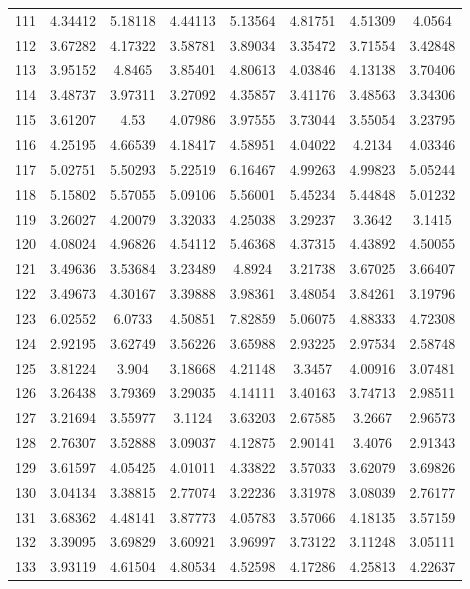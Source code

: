 \begin{center}
\begin{longtable}{cccccccc}
111 & 4.34412 & 5.18118 & 4.44113 & 5.13564 & 4.81751 & 4.51309 & 4.0564\\
112 & 3.67282 & 4.17322 & 3.58781 & 3.89034 & 3.35472 & 3.71554 & 3.42848\\
113 & 3.95152 & 4.8465 & 3.85401 & 4.80613 & 4.03846 & 4.13138 & 3.70406\\
114 & 3.48737 & 3.97311 & 3.27092 & 4.35857 & 3.41176 & 3.48563 & 3.34306\\
115 & 3.61207 & 4.53 & 4.07986 & 3.97555 & 3.73044 & 3.55054 & 3.23795\\
116 & 4.25195 & 4.66539 & 4.18417 & 4.58951 & 4.04022 & 4.2134 & 4.03346\\
117 & 5.02751 & 5.50293 & 5.22519 & 6.16467 & 4.99263 & 4.99823 & 5.05244\\
118 & 5.15802 & 5.57055 & 5.09106 & 5.56001 & 5.45234 & 5.44848 & 5.01232\\
119 & 3.26027 & 4.20079 & 3.32033 & 4.25038 & 3.29237 & 3.3642 & 3.1415\\
120 & 4.08024 & 4.96826 & 4.54112 & 5.46368 & 4.37315 & 4.43892 & 4.50055\\
121 & 3.49636 & 3.53684 & 3.23489 & 4.8924 & 3.21738 & 3.67025 & 3.66407\\
122 & 3.49673 & 4.30167 & 3.39888 & 3.98361 & 3.48054 & 3.84261 & 3.19796\\
123 & 6.02552 & 6.0733 & 4.50851 & 7.82859 & 5.06075 & 4.88333 & 4.72308\\
124 & 2.92195 & 3.62749 & 3.56226 & 3.65988 & 2.93225 & 2.97534 & 2.58748\\
125 & 3.81224 & 3.904 & 3.18668 & 4.21148 & 3.3457 & 4.00916 & 3.07481\\
126 & 3.26438 & 3.79369 & 3.29035 & 4.14111 & 3.40163 & 3.74713 & 2.98511\\
127 & 3.21694 & 3.55977 & 3.1124 & 3.63203 & 2.67585 & 3.2667 & 2.96573\\
128 & 2.76307 & 3.52888 & 3.09037 & 4.12875 & 2.90141 & 3.4076 & 2.91343\\
129 & 3.61597 & 4.05425 & 4.01011 & 4.33822 & 3.57033 & 3.62079 & 3.69826\\
130 & 3.04134 & 3.38815 & 2.77074 & 3.22236 & 3.31978 & 3.08039 & 2.76177\\
131 & 3.68362 & 4.48141 & 3.87773 & 4.05783 & 3.57066 & 4.18135 & 3.57159\\
132 & 3.39095 & 3.69829 & 3.60921 & 3.96997 & 3.73122 & 3.11248 & 3.05111\\
133 & 3.93119 & 4.61504 & 4.80534 & 4.52598 & 4.17286 & 4.25813 & 4.22637\\

\end{longtable}
\end{center}
